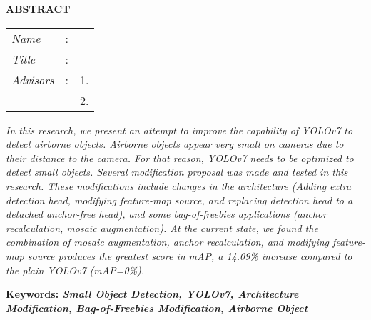 \begin{center}
  \large\textbf{ABSTRACT}
\end{center}


\vspace{2ex}

\begingroup
\setlength{\tabcolsep}{0pt}

\noindent
\begin{tabularx}{\textwidth}{l >{\centering}m{3em} X}
  \emph{Name}     & : & \name{}         \\

  \emph{Title}    & : & \engtatitle{}   \\

  \emph{Advisors} & : & 1. \advisor{}   \\
                  &   & 2. \coadvisor{} \\
\end{tabularx}
\endgroup

{
\itshape
In this research, we present an attempt to improve the capability of YOLOv7 to detect
airborne objects. Airborne objects appear very small on cameras due to their distance
to the camera. For that reason, YOLOv7 needs to be optimized to detect small objects.
Several modification proposal was made and tested in this research. These modifications
include changes in the architecture (Adding extra detection head, modifying feature-map
source, and replacing detection head to a detached anchor-free head), and some bag-of-freebies
applications (anchor recalculation, mosaic augmentation). At the current state, we found
the combination of mosaic augmentation, anchor recalculation, and modifying feature-map
source produces the greatest score in mAP, a 14.09\% increase compared to the plain
YOLOv7 (mAP=0\%).
}

\noindent
\textbf{Keywords: \emph{Small Object Detection, YOLOv7, Architecture Modification, Bag-of-Freebies Modification, Airborne Object}}
